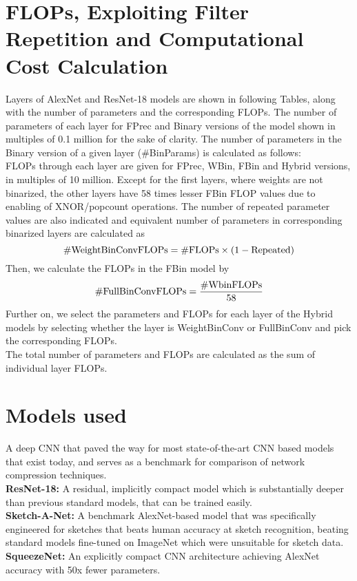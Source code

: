 \section{FLOPs, Exploiting Filter Repetition and Computational Cost Calculation}
\noindent Layers of AlexNet and ResNet-18 models are shown in following Tables, along with the number of parameters and the corresponding FLOPs. The number of parameters of each layer for FPrec and Binary versions of the model shown in multiples of 0.1 million for the sake of clarity. The number of parameters in the Binary version of a given layer (\#BinParams) is calculated as follows: \\

\noindent FLOPs through each layer are given for FPrec, WBin, FBin and Hybrid versions, in multiples of 10 million. Except for the first layers, where weights are not binarized, the other layers have 58 times lesser FBin FLOP values due to enabling of XNOR/popcount operations. The number of repeated parameter values are also indicated and equivalent number of parameters in corresponding binarized layers are calculated as 
$$ \textnormal{\#WeightBinConvFLOPs} = \textnormal{\#FLOPs} \times (1-\textnormal{Repeated})$$
Then, we calculate the FLOPs in the FBin model by
$$\textnormal{\#FullBinConvFLOPs} = \frac{\textnormal{\#WbinFLOPs}}{58}$$
Further on, we select the parameters and FLOPs for each layer of the Hybrid models by selecting whether the layer is WeightBinConv or FullBinConv and pick the corresponding FLOPs.\\
The total number of parameters and FLOPs are calculated as the sum of individual layer FLOPs.

\section{Models used}
 A deep CNN that paved the way for most state-of-the-art CNN based models that exist today, and serves as a benchmark for comparison of network compression techniques.\\
{\bf ResNet-18:} A residual, implicitly compact model which is substantially deeper than previous standard models, that can be trained easily. \\
{\bf Sketch-A-Net:} A benchmark AlexNet-based model that was specifically engineered for sketches that beats human accuracy at sketch recognition, beating standard models fine-tuned on ImageNet which were unsuitable for sketch data. \\
{\bf SqueezeNet:} An explicitly compact CNN architecture achieving AlexNet accuracy with 50x fewer parameters.\\

